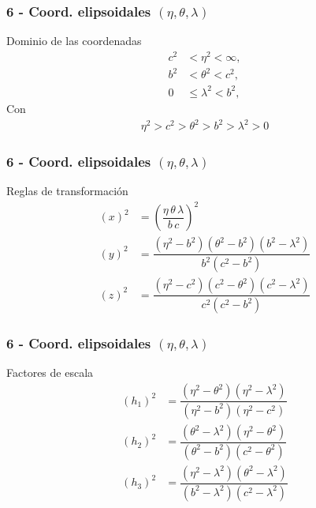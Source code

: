 \documentclass[12pt]{beamer}
\begin{document}
\begin{frame}
\frametitle{6 - Coord. elipsoidales $(\eta, \theta, \lambda)$}
\fontsize{12}{12}\selectfont
Dominio de las coordenadas
\begin{align*}
c^{2} &< \eta^{2} < \infty, \\
b^{2} &< \theta^{2} < c^{2}, \\
0 &\leq \lambda^{2} < b^{2},
\end{align*}
Con
\begin{align*}
\eta^{2} > c^{2} > \theta^{2} > b^{2} > \lambda^{2} > 0
\end{align*}
\end{frame}
\begin{frame}
\frametitle{6 - Coord. elipsoidales $(\eta, \theta, \lambda)$}
\fontsize{12}{12}\selectfont
Reglas de transformación
\begin{align*}
(x)^{2} &= \left( \dfrac{\eta \, \theta \, \lambda}{b \, c} \right)^{2} \\[0.5em]
(y)^{2} &= \dfrac{(\eta^{2} - b^{2})(\theta^{2} - b^{2})(b^{2} - \lambda^{2})}{b^{2}(c^{2} - b^{2})} \\[0.5em]
(z)^{2} &= \dfrac{(\eta^{2} - c^{2}) (c^{2} - \theta^{2})(c^{2} - \lambda^{2})}{c^{2} (c^{2} - b^{2})}
\end{align*}
\end{frame}
\begin{frame}
\frametitle{6 - Coord. elipsoidales $(\eta, \theta, \lambda)$}
\fontsize{12}{12}\selectfont
Factores de escala
\begin{align*}
(h_{1})^{2} &= \dfrac{(\eta^{2} - \theta^{2})(\eta^{2} - \lambda^{2})}{(\eta^{2} - b^{2})(\eta^{2} - c^{2})} \\[0.5em]
(h_{2})^{2} &= \dfrac{(\theta^{2} - \lambda^{2})(\eta^{2} - \theta^{2})}{(\theta^{2} - b^{2})(c^{2} - \theta^{2})} \\[0.5em]
(h_{3})^{2} &= \dfrac{(\eta^{2} - \lambda^{2})(\theta^{2} - \lambda^{2})}{(b^{2} -  \lambda^{2})(c^{2} - \lambda^{2})}
\end{align*}
\end{frame}
\end{document}
